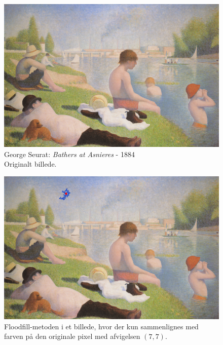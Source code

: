 {%
\begin{figure}[!h]
    \begin{center}
        \includegraphics[scale=8]{afsnit/vores_implementation/billeder/flood_fill/seurat_bathers}
    \end{center}
    \caption[George Seurat: \emph{Bathers at Asnieres} -- 1884]{George
    Seurat: \emph{Bathers at Asnieres} - 1884\\Originalt billede.}
    \label{bathers}
\end{figure}

\begin{figure}[!h]
    \begin{center}
        \includegraphics[scale=0.49]{afsnit/vores_implementation/billeder/flood_fill/dot_ff_fixed_7_7}
    \end{center}
    \caption[]{Floodfill-metoden i et billede, hvor der kun sammenlignes
    med farven på den originale pixel med afvigelsen $(7,7)$.}
    \label{dot_ff_fixed_7_7}
\end{figure}

}
